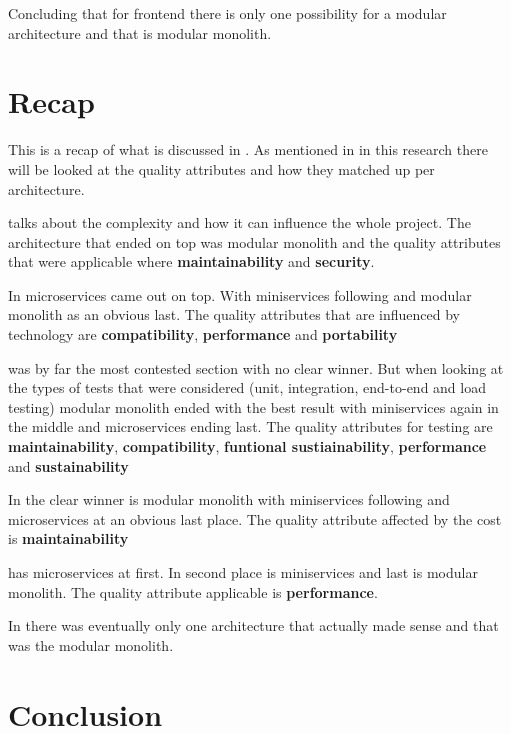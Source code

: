 Concluding that for frontend there is only one possibility for a modular architecture and that is modular monolith.

\section{Recap}

This is a recap of what is discussed in . As mentioned in  in this research there will be looked at the quality attributes and how they matched up per architecture.

 talks about the complexity and how it can influence the whole project. The architecture that ended on top was modular monolith and the quality attributes that were applicable where \textbf{maintainability} and \textbf{security}.

In  microservices came out on top. With miniservices following and modular monolith as an obvious last. The quality attributes that are influenced by technology are \textbf{compatibility}, \textbf{performance} and \textbf{portability}

 was by far the most contested section with no clear winner. But when looking at the types of tests that were considered (unit, integration, end-to-end and load testing) modular monolith ended with the best result with miniservices again in the middle and microservices ending last. The quality attributes for testing are \textbf{maintainability}, \textbf{compatibility}, \textbf{funtional sustiainability}, \textbf{performance} and \textbf{sustainability}

In  the clear winner is modular monolith with miniservices following and microservices at an obvious last place. The quality attribute affected by the cost is \textbf{maintainability}

 has microservices at first. In second place is miniservices and last is modular monolith. The quality attribute applicable is \textbf{performance}.

In  there was eventually only one architecture that actually made sense and that was the modular monolith.

\section{Conclusion}

